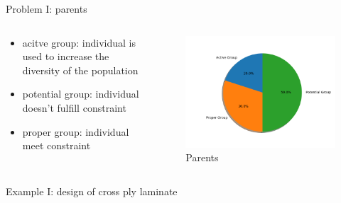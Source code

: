 \documentclass{beamer}
\begin{document}
\begin{frame}{Problem I: parents}
    \begin{columns}[c]
    \begin{column}{0.5\textwidth}
		\begin{itemize}
			\item acitve group: individual is used to increase the diversity of the population
			\item potential group: individual doesn't fulfill constraint
			\item proper group: individual meet constraint
		\end{itemize}
    \end{column}
	\begin{column}{0.5\textwidth}
		\begin{figure}
			\caption{Parents}
			\includegraphics[scale=0.5]{fig/chapter2_figure_group_pie.png}
		\end{figure}
	\end{column}
\end{columns}
\end{frame}

\begin{frame}{Example I: design of cross ply laminate}
	
\end{frame}
\end{document}
